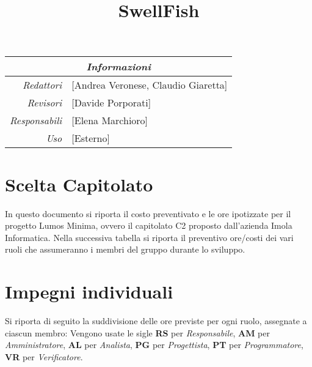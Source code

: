 \documentclass[12pt]{article}
\begin{document}
\graphicspath{ {images/} }


\title{SwellFish}
\firstPage
\maketitle

\begin{center}
    \begin{tabular}{r | l}
		\multicolumn{2}{c}{\textit{Informazioni}}\\
		\hline
		
			\textit{Redattori} &
			[Andrea Veronese, Claudio Giaretta]\makecell{}\\

			\textit{Revisori} &
			[Davide Porporati]\makecell{}\\
			\textit{Responsabili} &
			[Elena Marchioro]\makecell{}\\
		      \textit{Uso} & 
                [Esterno]\makecell{}\\
    \end{tabular}
\end{center}


\tableofcontents
\printindex 
\section{Scelta Capitolato}
In questo documento si riporta il costo preventivato e le ore ipotizzate per il progetto Lumos Minima, ovvero il capitolato C2 proposto dall'azienda Imola Informatica.
Nella successiva tabella si riporta il preventivo ore/costi dei vari ruoli che assumeranno i membri del gruppo durante lo sviluppo.

\section{Impegni individuali}
Si riporta di seguito la suddivisione delle ore previste per ogni ruolo, assegnate a ciascun membro:
\smallskip
\noindent Vengono usate le sigle \textbf{RS} per \textit{Responsabile}, \textbf{AM} per \textit{Amministratore}, \textbf{AL} per \textit{Analista}, \textbf{PG} per \textit{Progettista}, \textbf{PT} per \textit{Programmatore}, \textbf{VR} per \textit{Verificatore}.
\end{document}
